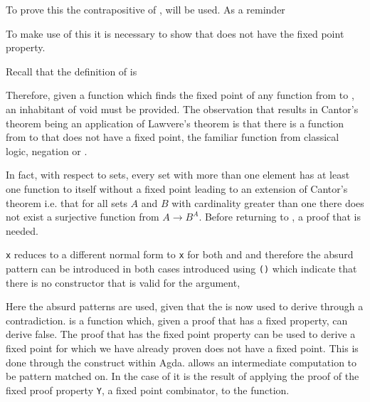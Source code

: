 To prove this  the contrapositive of
,  will be used. As a reminder


To make use of this it is necessary to show that  does not
have the fixed point property.


Recall that the definition of  is


Therefore, given a function which finds the fixed point of any function from
 to , an inhabitant of void must be
provided. The observation that results in Cantor's theorem being an application
of Lawvere's theorem is that there is a function from  to
 that does not have a fixed point, the familiar function from
classical logic, negation or .


In fact, with respect to sets, every set with more than one element has at least
one function to itself without a fixed point leading to an extension of Cantor's
theorem i.e. that for all sets $A$ and $B$ with cardinality greater than one
there does not exist a surjective function from $A \rightarrow B^A$. Before
returning to , a proof that  is
needed.


 \verb|x| reduces to a different normal form to \verb|x| for
both  and  and therefore the absurd pattern can
be introduced in both cases introduced using \verb|()| which indicate
that there is no constructor that is valid for the argument,


Here the absurd patterns are used,  given that the
 is now used to derive 
through a contradiction.   is a function
which, given a proof that  has a fixed property, can derive
false. The proof that  has the fixed point property can be
used to derive a fixed point for  which we have already proven
does not have a fixed point. This is done through the 
construct within Agda.  allows an intermediate computation to
be pattern matched on. In the case of  it is the
result of applying the proof of the fixed proof property \verb|Y|, a fixed point
combinator, to the  function.

